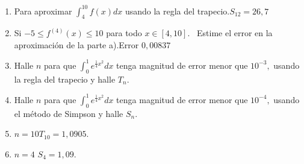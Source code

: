 \begin{enumerate}
\item {Para aproximar $\displaystyle\int_{4}^{10}f\left( x\right) dx$ usando la regla del trapecio.}{$S_{12}=26,7$}

\item {Si $-5\leq f^{\left( 4\right) }\left( x\right) \leq 10$ para todo $x\in %
\left[ 4,10\right] .$ \ Estime el error en la aproximación de la parte
a).}{Error $0,00837$}



\item {Halle $n$ para que $\displaystyle\int_{0}^{1}e^{\frac{1}{4}x^{2}}dx$ tenga magnitud de error menor que $10^{-3},$ usando la regla del trapecio y halle $T_{n}.$}



\item {Halle $n$ para que $\displaystyle\int_{0}^{1}e^{\frac{1}{4}x^{2}}dx$ tenga magnitud de error menor que $10^{-4},$ usando el método de Simpson y halle $S_{n}.$}\\
\item {$n=10$\qquad $T_{10}=1,0905.$\qquad}\\
\item {$n=4$ \qquad $S_{4}=1,09.$}

\end{enumerate}